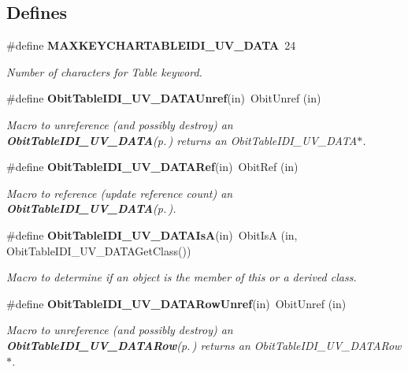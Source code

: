\subsection*{Defines}
\begin{CompactItemize}
\item 
\#define {\bf MAXKEYCHARTABLEIDI\_\-UV\_\-DATA}\ 24
\begin{CompactList}\small\item\em Number of characters for Table keyword. \item\end{CompactList}\item 
\#define {\bf Obit\-Table\-IDI\_\-UV\_\-DATAUnref}(in)\ Obit\-Unref (in)
\begin{CompactList}\small\item\em Macro to unreference (and possibly destroy) an {\bf Obit\-Table\-IDI\_\-UV\_\-DATA}{\rm (p.\,\pageref{structObitTableIDI__UV__DATA})} returns an Obit\-Table\-IDI\_\-UV\_\-DATA$\ast$. \item\end{CompactList}\item 
\#define {\bf Obit\-Table\-IDI\_\-UV\_\-DATARef}(in)\ Obit\-Ref (in)
\begin{CompactList}\small\item\em Macro to reference (update reference count) an {\bf Obit\-Table\-IDI\_\-UV\_\-DATA}{\rm (p.\,\pageref{structObitTableIDI__UV__DATA})}. \item\end{CompactList}\item 
\#define {\bf Obit\-Table\-IDI\_\-UV\_\-DATAIs\-A}(in)\ Obit\-Is\-A (in, Obit\-Table\-IDI\_\-UV\_\-DATAGet\-Class())
\begin{CompactList}\small\item\em Macro to determine if an object is the member of this or a derived class. \item\end{CompactList}\item 
\#define {\bf Obit\-Table\-IDI\_\-UV\_\-DATARow\-Unref}(in)\ Obit\-Unref (in)
\begin{CompactList}\small\item\em Macro to unreference (and possibly destroy) an {\bf Obit\-Table\-IDI\_\-UV\_\-DATARow}{\rm (p.\,\pageref{structObitTableIDI__UV__DATARow})} returns an Obit\-Table\-IDI\_\-UV\_\-DATARow$\ast$. \item\end{CompactList}\item 

\end{CompactItemize}

